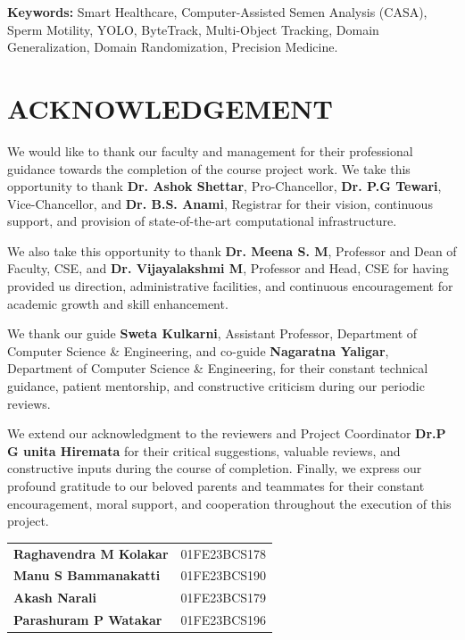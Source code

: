 \documentclass[12pt,a4paper]{report}
\begin{document}
\vspace{0.8cm}
\noindent \textbf{Keywords:} Smart Healthcare, Computer-Assisted Semen Analysis (CASA), Sperm Motility, YOLO, ByteTrack, Multi-Object Tracking, Domain Generalization, Domain Randomization, Precision Medicine.

\newpage
\chapter*{ACKNOWLEDGEMENT}
We would like to thank our faculty and management for their professional guidance towards the completion of the course project work. We take this opportunity to thank \textbf{Dr. Ashok Shettar}, Pro-Chancellor, \textbf{Dr. P.G Tewari}, Vice-Chancellor, and \textbf{Dr. B.S. Anami}, Registrar for their vision, continuous support, and provision of state-of-the-art computational infrastructure.

We also take this opportunity to thank \textbf{Dr. Meena S. M}, Professor and Dean of Faculty, CSE, and \textbf{Dr. Vijayalakshmi M}, Professor and Head, CSE for having provided us direction, administrative facilities, and continuous encouragement for academic growth and skill enhancement.

We thank our guide \textbf{Sweta Kulkarni}, Assistant Professor, Department of Computer Science \& Engineering, and co-guide \textbf{Nagaratna Yaligar}, Department of Computer Science \& Engineering, for their constant technical guidance, patient mentorship, and constructive criticism during our periodic reviews.

We extend our acknowledgment to the reviewers and Project Coordinator \textbf{Dr.P G unita Hiremata} for their critical suggestions, valuable reviews, and constructive inputs during the course of completion. Finally, we express our profound gratitude to our beloved parents and teammates for their constant encouragement, moral support, and cooperation throughout the execution of this project.

\vspace{2.5cm}
\begin{flushright}
\begin{tabular}{ll}
\textbf{Raghavendra M Kolakar} & 01FE23BCS178 \\
\textbf{Manu S Bammanakatti} & 01FE23BCS190 \\
\textbf{Akash Narali} & 01FE23BCS179 \\
\textbf{Parashuram P Watakar} & 01FE23BCS196 \\
\end{tabular}
\end{flushright}
\end{document}
